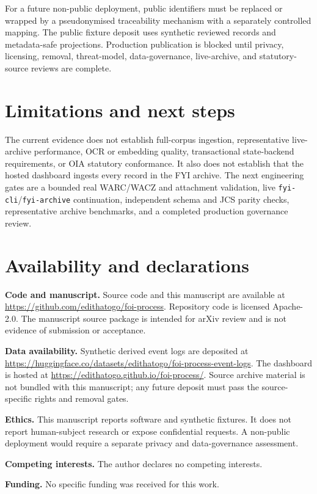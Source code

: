 \documentclass[11pt]{article}
\begin{document}
For a future non-public deployment, public identifiers must be replaced or wrapped by a
pseudonymised traceability mechanism with a separately controlled mapping. The public fixture
deposit uses synthetic reviewed records and metadata-safe projections. Production publication is
blocked until privacy, licensing, removal, threat-model, data-governance, live-archive, and
statutory-source reviews are complete.

\section{Limitations and next steps}
The current evidence does not establish full-corpus ingestion, representative live-archive
performance, OCR or embedding quality, transactional state-backend requirements, or OIA statutory
conformance. It also does not establish that the hosted dashboard ingests every record in the FYI
archive. The next engineering gates are a bounded real WARC/WACZ and attachment validation, live
\texttt{fyi-cli}/\texttt{fyi-archive} continuation, independent schema and JCS parity checks,
representative archive benchmarks, and a completed production governance review.

\section{Availability and declarations}
\textbf{Code and manuscript.} Source code and this manuscript are available at
\url{https://github.com/edithatogo/foi-process}. Repository code is licensed Apache-2.0. The
manuscript source package is intended for arXiv review and is not evidence of submission or
acceptance.

\textbf{Data availability.} Synthetic derived event logs are deposited at
\url{https://huggingface.co/datasets/edithatogo/foi-process-event-logs}. The dashboard is hosted at
\url{https://edithatogo.github.io/foi-process/}. Source archive material is not bundled with this
manuscript; any future deposit must pass the source-specific rights and removal gates.

\textbf{Ethics.} This manuscript reports software and synthetic fixtures. It does not report
human-subject research or expose confidential requests. A non-public deployment would require a
separate privacy and data-governance assessment.

\textbf{Competing interests.} The author declares no competing interests.

\textbf{Funding.} No specific funding was received for this work.
\end{document}
